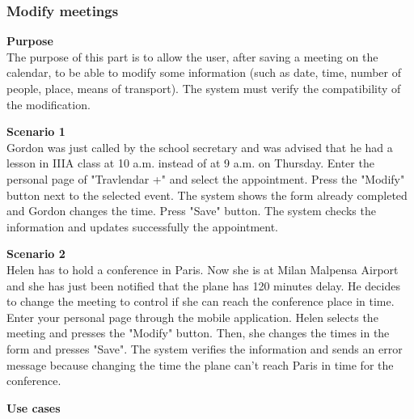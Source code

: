 \documentclass{article}
\begin{document}
	\subsubsection{Modify meetings}
	
	\bigskip
	\noindent
	\textbf{Purpose} \\
	The purpose of this part is to allow the user, after saving a meeting on the calendar, to be able to modify some information (such as date, time, number of people, place, means of transport). The system must verify the compatibility of the modification.
	
	\bigskip
	\noindent
	\textbf{Scenario 1} \\
	Gordon was just called by the school secretary and was advised that he had a lesson in IIIA class at 10 a.m. instead of at 9 a.m. on Thursday. Enter the personal page of "Travlendar +" and select the appointment. Press the "Modify" button next to the selected event. The system shows the form already completed and Gordon changes the time. Press  "Save" button. The system checks the information and updates successfully the appointment.
	
	\bigskip
	\noindent
	\textbf{Scenario 2} \\
	Helen has to hold a conference in Paris. Now she is at Milan Malpensa Airport and she has just been notified that the plane has 120 minutes delay. He decides to change the meeting to control if she can reach the conference place in time. Enter your personal page through the mobile application. Helen selects the meeting and presses the "Modify" button. Then, she changes the times in the form and presses "Save". The system verifies the information and sends an error message because changing the time the plane can't  reach Paris in time for the conference.
	
	\bigskip
	\noindent
	\textbf{Use cases} \\
	
\end{document}
